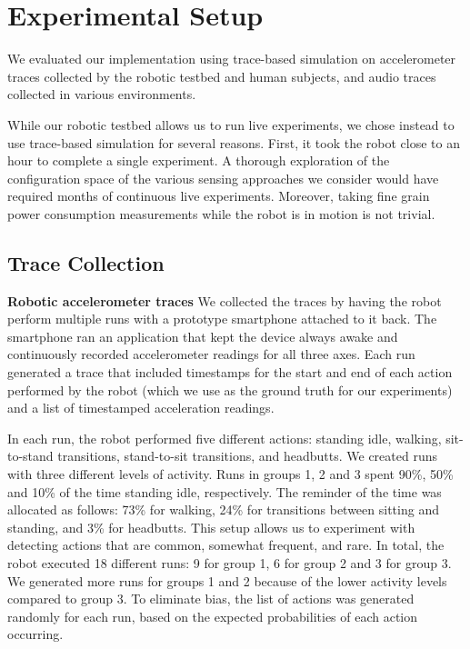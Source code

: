 \section{Experimental Setup}
\label{sec:experimentalSetup}

We evaluated our implementation using trace-based simulation on 
accelerometer traces collected by the robotic testbed and human 
subjects, and audio traces collected in various environments.

While our robotic testbed allows us to run 
live experiments, we chose instead to use trace-based simulation for 
several reasons.  First, it
took the robot close to an hour to complete a single experiment.  A
thorough exploration of the configuration space of the various sensing
approaches we consider would have required months of continuous
live experiments.  Moreover, taking fine grain power consumption
measurements while the robot is in motion is not trivial.


\subsection{Trace Collection}

{\bf Robotic accelerometer traces} We collected the traces by having 
the robot perform multiple runs with
a prototype smartphone attached to it back.  The smartphone ran an
application that kept the device always awake and continuously recorded
accelerometer readings for all three axes.  Each run generated a
trace that included timestamps for the start and end of each action
performed by the robot (which we use as the ground truth for our
experiments) and a list of timestamped acceleration readings.

In each run, the robot performed five different actions: standing
idle, walking, sit-to-stand transitions, stand-to-sit transitions, and
headbutts.  We created runs with three different levels of activity.
Runs in groups 1, 2 and 3 spent 90\%, 50\% and 10\% of the time
standing idle, respectively. The reminder of the time was allocated as
follows: 73\% for walking, 24\% for transitions between sitting and
standing, and 3\% for headbutts.  This setup allows us to experiment
with detecting actions that are common, somewhat frequent, and rare.
In total, the robot executed 18 different runs: 9 for group 1, 6
for group 2 and 3 for group 3.  We generated more runs for groups 1
and 2 because of the lower activity levels compared to group 3. To
eliminate bias, the list of actions was generated randomly for each
run, based on the expected probabilities of each action occurring.


